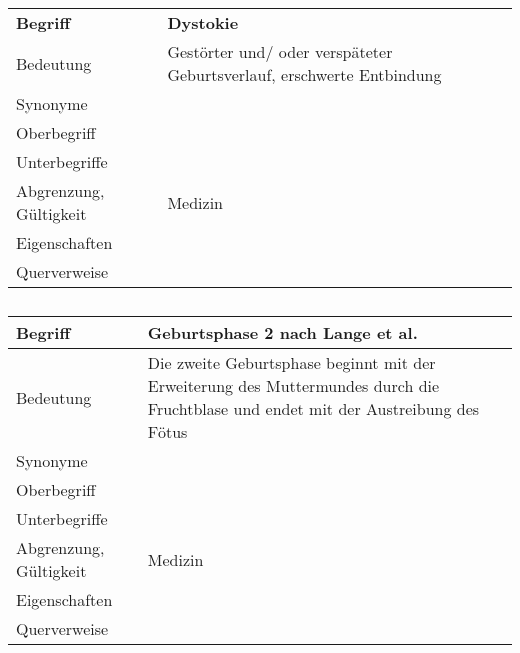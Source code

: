 \begin{table}[h]
	\centering	
	\begin{tabular}{ p{4.5cm} p{10.5cm} } 
		\toprule[1pt]
		\rowcolor{maroon!30}
		\textbf{Begriff} &  \textbf{Dystokie} \\		
	
		Bedeutung  & Gestörter und/ oder verspäteter Geburtsverlauf, erschwerte Entbindung\\		
		Synonyme  & \\				
		Oberbegriff  &  \\		
		Unterbegriffe   & \\		
		Abgrenzung, Gültigkeit  & Medizin\\				
		Eigenschaften  & \\			
		Querverweise  & \\	
		\bottomrule				
		
	\end{tabular}
	\label{tab: Glossareintrag zu Vorkalbeperiode}
	\caption{}
\end{table}
\begin{table}[h]
	\centering	
	\begin{tabular}{ p{4.5cm} p{10.5cm} } 
		\toprule[1pt]
		\rowcolor{maroon!30}
		\textbf{Begriff} &  \textbf{Geburtsphase 2 nach Lange et al.}\\		
		\midrule
	
		Bedeutung  & Die zweite Geburtsphase beginnt mit der Erweiterung des Muttermundes durch die  Fruchtblase und endet mit der Austreibung des Fötus \cite{Lange2017}\\		
		Synonyme  & \\			
		Oberbegriff  &  \\		
		Unterbegriffe   & \\		
		Abgrenzung, Gültigkeit  & Medizin\\			
		Eigenschaften  & \\			
		Querverweise  &\\		
		\bottomrule			
		
	\end{tabular}
	\label{tab: Glossareintrag zu Geburtsphase 2 nach Lange et al.}
	\caption{}
\end{table}


